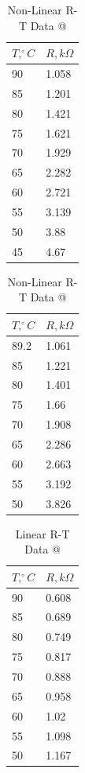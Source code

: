 \documentclass[a4,11pt]{article}
\makeatletter
\newcommand*{\rom}[1]{\expandafter\@slowromancap\romannumeral #1@}
\makeatother
\begin{document}
\begin{table}[H]
	\centering
	\caption{Non-Linear R-T Data \rom{2}}
	\begin{tabular}{l|l}
		\hline
		$T, ^{\circ}C$ & $R, k\Omega$ \\
		\hline
		90 & 1.058  \\
		85 & 1.201  \\
		80 & 1.421  \\
		75 & 1.621  \\
		70 & 1.929  \\
		65 & 2.282  \\
		60 & 2.721  \\
		55 & 3.139  \\
		50 & 3.88  \\
		45 & 4.67  \\
	\end{tabular}
\end{table}

\begin{table}[H]
	\centering
	\caption{Non-Linear R-T Data \rom{3}}
	\begin{tabular}{l|l}
		\hline
		$T, ^{\circ}C$ & $R, k\Omega$ \\
		\hline
		89.2 & 1.061  \\
		85 & 1.221  \\
		80 & 1.401  \\
		75 & 1.66  \\
		70 & 1.908  \\
		65 & 2.286  \\
		60 & 2.663  \\
		55 & 3.192  \\
		50 & 3.826  \\
	\end{tabular}
\end{table}

\begin{table}[H]
	\centering
	\caption{Linear R-T Data \rom{1}}
	\begin{tabular}{l|l}
		\hline
		$T, ^{\circ}C$ & $R, k\Omega$ \\
		\hline
		90 & 0.608  \\
		85 & 0.689  \\
		80 & 0.749  \\
		75 & 0.817  \\
		70 & 0.888  \\
		65 & 0.958  \\
		60 & 1.02  \\
		55 & 1.098  \\
		50 & 1.167  \\
	\end{tabular}
\end{table}
\end{document}
